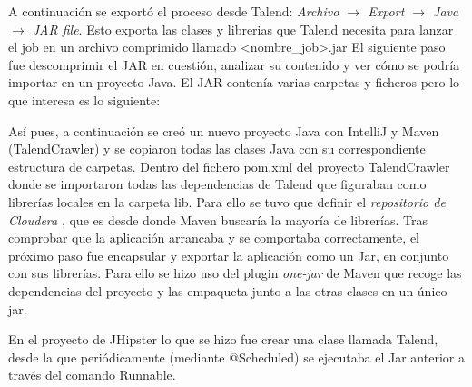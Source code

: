 A continuación se exportó el proceso desde Talend: 
\textit{Archivo $\rightarrow$ Export $\rightarrow$ Java $\rightarrow$ JAR file}. Esto exporta las clases y librerias que Talend necesita para lanzar el job en un archivo comprimido llamado <nombre\_job>.jar
El siguiente paso fue descomprimir el JAR en cuestión, analizar su contenido y ver cómo se podría importar en un proyecto Java. El JAR contenía varias carpetas y ficheros pero lo que interesa es lo siguiente:
\bigskip
\par 
{}
\bigskip
\par
Así pues, a continuación se creó un nuevo proyecto Java con IntelliJ y Maven (TalendCrawler) y se copiaron todas las clases Java con su correspondiente estructura de carpetas. Dentro del fichero pom.xml del proyecto TalendCrawler donde se importaron todas las dependencias de Talend que figuraban como librerías locales en la carpeta lib. Para ello se tuvo que definir el \textit{repositorio de Cloudera} \cite{cloudera}, que es desde donde Maven buscaría la mayoría de librerías. Tras comprobar que la aplicación arrancaba y se comportaba correctamente, el próximo paso fue encapsular y exportar la aplicación como un Jar, en conjunto con sus librerías. Para ello se hizo uso del plugin \textit{one-jar} de Maven que recoge las dependencias del proyecto y las empaqueta junto a las otras clases en un único jar.\par 

En el proyecto de JHipster lo que se hizo fue crear una clase llamada Talend, desde la que periódicamente (mediante @Scheduled) se ejecutaba el Jar anterior a través del comando Runnable. 
\bigskip



